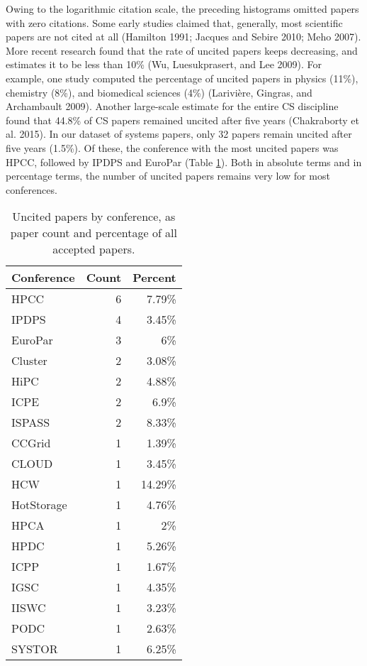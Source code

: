\documentclass{article}
\begin{document}
Owing to the logarithmic citation scale, the preceding histograms omitted papers with zero citations.
Some early studies claimed that, generally, most scientific papers are not cited at all (Hamilton 1991; Jacques and Sebire 2010; Meho 2007).
More recent research found that the rate of uncited papers keeps decreasing, and estimates it to be less than 10\% (Wu, Luesukprasert, and Lee 2009).
For example, one study computed the percentage of uncited papers in physics (11\%), chemistry (8\%), and biomedical sciences (4\%) (Larivière, Gingras, and Archambault 2009).
Another large-scale estimate for the entire CS discipline found that 44.8\% of CS papers remained uncited after five years (Chakraborty et al. 2015).
In our dataset of systems papers, only 32 papers remain uncited after five years
(1.5\%).
Of these, the conference with the most uncited papers was HPCC, followed by IPDPS and EuroPar (Table \ref{tab:uncited-conf}).
Both in absolute terms and in percentage terms, the number of uncited papers remains very low for most conferences.

\begin{table}

\caption{\label{tab:uncited-conf}Uncited papers by conference, as paper count and percentage of all accepted papers.}
\centering
\begin{tabular}[t]{lrr}
\toprule
Conference & Count & Percent\\
\midrule
HPCC & 6 & 7.79\%\\
IPDPS & 4 & 3.45\%\\
EuroPar & 3 & 6\%\\
Cluster & 2 & 3.08\%\\
HiPC & 2 & 4.88\%\\
ICPE & 2 & 6.9\%\\
ISPASS & 2 & 8.33\%\\
CCGrid & 1 & 1.39\%\\
CLOUD & 1 & 3.45\%\\
HCW & 1 & 14.29\%\\
HotStorage & 1 & 4.76\%\\
HPCA & 1 & 2\%\\
HPDC & 1 & 5.26\%\\
ICPP & 1 & 1.67\%\\
IGSC & 1 & 4.35\%\\
IISWC & 1 & 3.23\%\\
PODC & 1 & 2.63\%\\
SYSTOR & 1 & 6.25\%\\
\bottomrule
\end{tabular}
\end{table}
\end{document}
